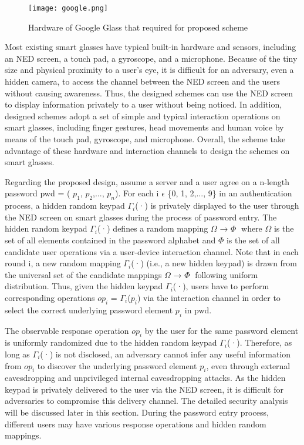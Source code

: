 \documentclass[12pt,a4paper,oneside]{report}
\begin{document}
\begin{figure}[H]
    \begin{center}
        \label{abc}
            \texttt{[image: google.png]}
            \caption{Hardware of Google Glass that required for proposed scheme}
    \end{center}
\end{figure}
\par
Most existing smart glasses have typical built-in hardware
and sensors, including an NED screen, a touch pad, a gyroscope, and a microphone. Because of the tiny size and physical proximity to a user’s eye,
it is difficult for an adversary, even a hidden camera, to access
the channel between the NED screen and the users without
causing awareness. Thus, the designed schemes can use the
NED screen to display information privately to a user without
being noticed. In addition, designed schemes adopt a set of simple
and typical interaction operations on smart glasses, including
finger gestures, head movements and human voice by means
of the touch pad, gyroscope, and microphone. Overall, the scheme take
advantage of these hardware and interaction channels to design
the schemes on smart glasses. 
\par 
Regarding the proposed design, assume a server and a user agree
on a n-length password \newline pwd = ( $p_1$, $p_2$,..., $p_n$). For each
i $\epsilon$ \{0, 1, 2,..., 9\} in an authentication process, a hidden random
keypad $\Gamma_i$(·) is privately displayed to the user through the
NED screen on smart glasses during the process of password
entry. The hidden random keypad $\Gamma_i$(·) defines a random
mapping \newline $\Omega$ → $\Phi$ where $\Omega$ is the set of all elements contained
in the password alphabet and $\Phi$ is the set of all candidate
user operations via a user-device interaction channel. Note
that in each round i, a new random mapping $\Gamma_i$(·) (i.e., a new
hidden keypad) is drawn from the universal set of the candidate
mappings $\Omega$ → $\Phi$ following uniform distribution. Thus, given
the hidden keypad $\Gamma_i$(·), users have to perform corresponding
operations $op_i$ = $\Gamma_i$($p_i$) via the interaction channel in order
to select the correct underlying password element $p_i$ in pwd.

\par 
The observable response operation $op_i$ by the user for the
same password element is uniformly randomized due to the
hidden random keypad $\Gamma_i$(·). Therefore, as long as $\Gamma_i$(·) is not
disclosed, an adversary cannot infer any useful information
from $op_i$ to discover the underlying password element $p_i$,
even through external eavesdropping and unprivileged internal
eavesdropping attacks. As the hidden keypad is privately
delivered to the user via the NED screen, it is difficult for
adversaries to compromise this delivery channel. The detailed
security analysis will be discussed later in this section.
During the password entry process, different users may have
various response operations and hidden random mappings.
\end{document}
